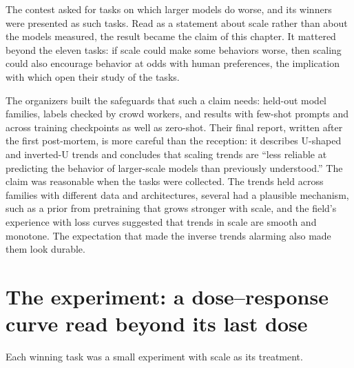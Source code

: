 \begin{refsection}
The contest asked for tasks on which larger models do worse, and its winners were presented as such tasks. Read as a statement about scale rather than about the models measured, the result became the claim of this chapter. It mattered beyond the eleven tasks: if scale could make some behaviors worse, then scaling could also encourage behavior at odds with human preferences, the implication with which \textcite{WeiEtAl2023} open their study of the tasks.

The organizers built the safeguards that such a claim needs: held-out model families, labels checked by crowd workers, and results with few-shot prompts and across training checkpoints as well as zero-shot. Their final report, written after the first post-mortem, is more careful than the reception: it describes U-shaped and inverted-U trends and concludes that scaling trends are ``less reliable at predicting the behavior of larger-scale models than previously understood.'' The claim was reasonable when the tasks were collected. The trends held across families with different data and architectures, several had a plausible mechanism, such as a prior from pretraining that grows stronger with scale, and the field's experience with loss curves suggested that trends in scale are smooth and monotone. The expectation that made the inverse trends alarming also made them look durable.

\section{The experiment: a dose--response curve read beyond its last dose}\label{sec:extrapolation:experiment}

Each winning task was a small experiment with scale as its treatment.

\begin{experiment}
\end{experiment}


\end{refsection}
